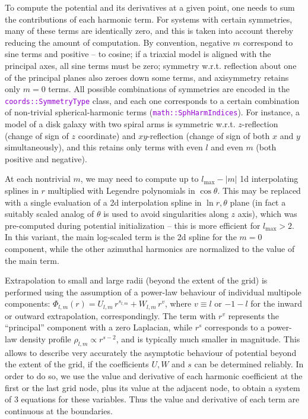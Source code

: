 \documentclass[12pt]{article}
\newcommand{\ttt}[1]{\textcolor{darkviolet}{\texttt{#1}}}
\begin{document}
To compute the potential and its derivatives at a given point, one needs to sum the contributions of each harmonic term. For systems with certain symmetries, many of these terms are identically zero, and this is taken into account thereby reducing the amount of computation. By convention, negative $m$ correspond to sine terms and positive -- to cosine; if a triaxial model is aligned with the principal axes, all sine terms must be zero; symmetry w.r.t. reflection about one of the principal planes also zeroes down some terms, and axisymmetry retains only $m=0$ terms. All possible combinations of symmetries are encoded in the \ttt{coords::SymmetryType} class, and each one corresponds to a certain combination of non-trivial spherical-harmonic terms (\ttt{math::SphHarmIndices}). For instance, a model of a disk galaxy with two spiral arms is symmetric w.r.t. $z$-reflection (change of sign of $z$ coordinate) and $xy$-reflection (change of sign of both $x$ and $y$ simultaneously), and this retains only terms with even $l$ and even $m$ (both positive and negative).

At each nontrivial $m$, we may need to compute up to $l_\mathrm{max}-|m|$ 1d interpolating splines in $r$ multiplied with Legendre polynomials in $\cos\theta$. This may be replaced with a single evaluation of a 2d interpolation spline in $\ln r,\theta$ plane (in fact a suitably scaled analog of $\theta$ is used to avoid singularities along $z$ axis), which was pre-computed during potential initialization -- this is more efficient for $l_\mathrm{max}>2$. In this variant, the main log-scaled term is the 2d spline for the $m=0$ component, while the other azimuthal harmonics are normalized to the value of the main term.

Extrapolation to small and large radii (beyond the extent of the grid) is performed using the assumption of a power-law behaviour of individual multipole components: $\Phi_{l,m}(r) = U_{l,m}\, r^{s_{l,m}} + W_{l,m}\, r^{v}$, where $v\equiv l$ or $-1-l$ for the inward or outward extrapolation, correspondingly. The term with $r^v$ represents the ``principal'' component with a zero Laplacian, while $r^s$ corresponds to a power-law density profile $\rho_{l,m}\propto r^{s-2}$, and is typically much smaller in magnitude. This allows to describe very accurately the asymptotic behaviour of potential beyond the extent of the grid, if the coefficients $U,W$ and $s$ can be determined reliably. In order to do so, we use the value and derivative of each harmonic coefficient at the first or the last grid node, plus its value at the adjacent node, to obtain a system of 3 equations for these variables. Thus the value and derivative of each term are continuous at the boundaries. 
\end{document}
